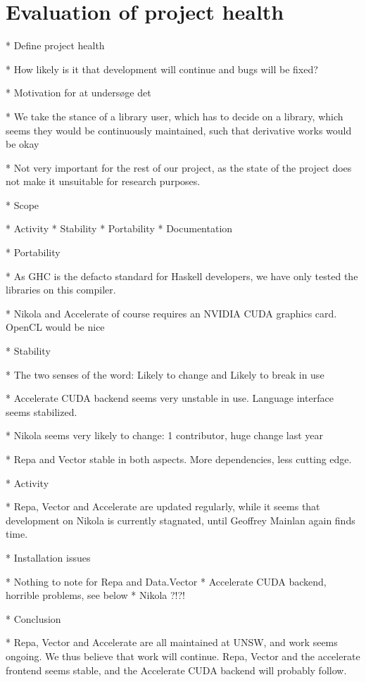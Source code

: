 \chapter{Evaluation of project health}

* Define project health
  
  * How likely is it that development will continue and bugs will be fixed?

* Motivation for at undersøge det
  
  * We take the stance of a library user, which has to decide on
    a library, which seems they would be continuously maintained, such
    that derivative works would be okay

  * Not very important for the rest of our project, as the state of
    the project does not make it unsuitable for research purposes.

* Scope
  
  * Activity
  * Stability
  * Portability
  * Documentation

* Portability 
  
  * As GHC is the defacto standard for Haskell developers, we have
    only tested the libraries on this compiler.

  * Nikola and Accelerate of course requires an NVIDIA CUDA graphics
    card. OpenCL would be nice

* Stability 
  
  * The two senses of the word: Likely to change and Likely to break in use

  * Accelerate CUDA backend seems very unstable in use. Language
    interface seems stabilized.

  * Nikola seems very likely to change: 1 contributor, huge change
    last year

  * Repa and Vector stable in both aspects. More dependencies,
    less cutting edge.

* Activity

  * Repa, Vector and Accelerate are updated regularly, while it seems
    that development on Nikola is currently stagnated, until Geoffrey
    Mainlan again finds time.

* Installation issues

  * Nothing to note for Repa and Data.Vector
  * Accelerate CUDA backend, horrible problems, see below
  * Nikola ?!?!

* Conclusion

  * Repa, Vector and Accelerate are all maintained at UNSW, and work
    seems ongoing. We thus believe that work will continue. Repa, Vector
    and the accelerate frontend seems stable, and the Accelerate CUDA
    backend will probably follow.

